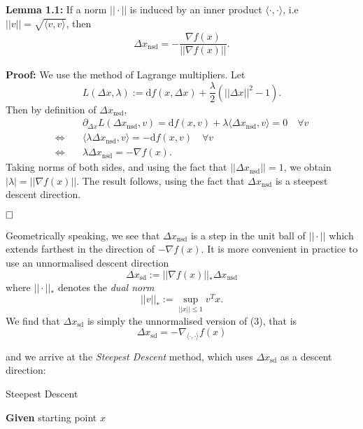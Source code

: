\documentclass[a4paper,11pt]{article}
\begin{document}
\textbf{Lemma 1.1:} If a norm $||\cdot||$ is induced by an inner product $\langle\cdot,\cdot\rangle$, i.e $||v||=\sqrt{\langle v,v\rangle}$, then \begin{align}\Delta x_{\text{nsd}}=-\dfrac{\nabla f(x)}{||\nabla f(x)||}.\end{align}

\vspace{3mm}

\textbf{Proof:} We use the method of Lagrange multipliers. Let $$L(\Delta x,\lambda):=\text{d}f(x,\Delta x)+\frac{\lambda}{2}(||\Delta x||^2-1).$$ Then by definition of $\Delta x_{\text{nsd}}$, 
\begin{align*}
&\partial_{\Delta x}L(\Delta x_{\text{nsd}},v)=\text{d}f(x,v)+\lambda \langle \Delta x_{\text{nsd}},v\rangle=0 \quad \forall v \\ \Longleftrightarrow \quad& \langle \lambda \Delta x_{\text{nsd}},v\rangle=-\text{d}f(x,v) \quad \forall v \\ \Longleftrightarrow \quad& \lambda \Delta x_{\text{nsd}}=-\nabla f(x).
\end{align*}
Taking norms of both sides, and using the fact that $||\Delta x_{\text{nsd}}||=1$, we obtain $|\lambda|=||\nabla f(x)||$. The result follows, using the fact that $\Delta x_{\text{nsd}}$ is a steepest descent direction.

$\hfill\square$

\vspace{3mm}

Geometrically speaking, we see that $\Delta x_{\text{nsd}}$ is a step in the unit ball of $||\cdot||$ which extends farthest in the direction of $-\nabla f(x)$. It is more convenient in practice to use an unnormalised descent direction $$\Delta x_{\text{sd}}:=||\nabla f(x)||_*\Delta x_{\text{nsd}}$$ where $||\cdot||_*$ denotes the \textit{dual norm} $$||v||_*:=\sup_{||x||\leqslant 1} v^Tx.$$ We find that $\Delta x_{\text{sd}}$ is simply the unnormalised version of (3), that is $$\Delta x_{\text{sd}}=-\nabla_{\langle\cdot,\cdot\rangle} f(x)$$ 

and we arrive at the \textit{Steepest Descent} method, which uses $\Delta x_{\text{sd}}$ as a descent direction:

\vspace{3mm}

\colorbox{blue!10}{\begin{algorithm}[H]\DontPrintSemicolon

\caption{Steepest Descent}
 
 \textbf{Given} starting point $x$
 

\end{algorithm}}
\end{document}
